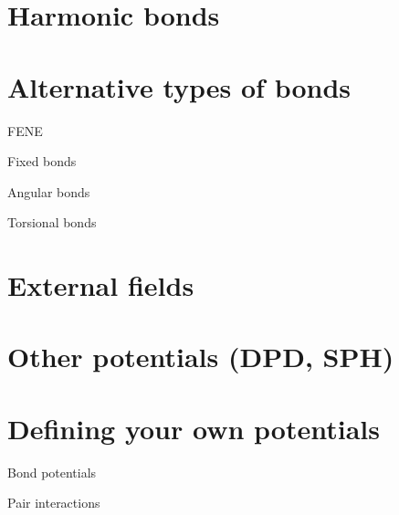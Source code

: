 \section{Harmonic bonds}

\section{Alternative types of bonds}

FENE

Fixed bonds

Angular bonds

Torsional bonds

\section{External fields}

\section{Other potentials (DPD, SPH)}

\section{Defining your own potentials}

Bond potentials

Pair interactions

